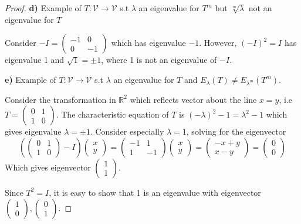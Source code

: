 \documentclass{article}
\begin{document}
\begin{proof}
\textbf{d)} Example of $T: \mathcal{V} \to \mathcal{V}$ s.t $\lambda$ an eigenvalue for $T^m$ but $\sqrt[m]{\lambda}$ not an eigenvalue for $T$
\smallskip

Consider $-I = \begin{pmatrix} -1 & 0 \\ 0& -1 \end{pmatrix}$ which has eigenvalue $-1$. However, $(-I)^2 = I$ has eigenvalue 1 and $\sqrt{1} = \pm 1$, where 1 is not an eigenvalue of $-I$.
\bigskip

\textbf{e)} Example of $T: \mathcal{V} \to \mathcal{V}$ s.t $\lambda$ an eigenvalue for $T$ and $E_\lambda(T) \ne E_{\lambda^m}(T^m)$.
\smallskip

Consider the transformation in $\mathbb{R}^2$ which reflects vector about the line $x=y$, i.e $T = \begin{pmatrix} 0 & 1 \\ 1 & 0 \end{pmatrix}$. The characteristic equation of $T$ is $(-\lambda)^2 -1= \lambda^2 -1$ which gives eigenvalue $\lambda = \pm 1$. Consider especially $\lambda = 1$, solving for the eigenvector
$$(\begin{pmatrix} 0 & 1 \\ 1 & 0 \end{pmatrix} - I) \begin{pmatrix} x \\y \end{pmatrix} = \begin{pmatrix} -1 &1 \\ 1 & -1 \end{pmatrix} \begin{pmatrix} x \\ y \end{pmatrix} = \begin{pmatrix} -x+y \\ x -y \end{pmatrix} = \begin{pmatrix} 0 \\ 0 \end{pmatrix} $$
Which gives eigenvector $\begin{pmatrix} 1 \\ 1 \end{pmatrix}$.

Since $T^2 = I$, it is easy to show that 1 is an eigenvalue with eigenvector $\begin{pmatrix} 1 \\ 0 \end{pmatrix}, \begin{pmatrix} 0 \\1 \end{pmatrix}$. 


\end{proof}
\end{document}
